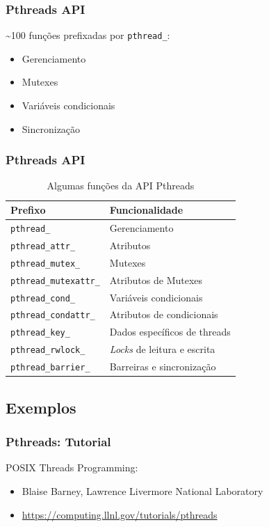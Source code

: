 \documentclass[10pt, compress, aspectratio=169, xcolor={table,usenames,dvipsnames}]{beamer}
\begin{document}
\begin{frame}
    \frametitle{Pthreads API}
    \alert{\textasciitilde{}100 funções} prefixadas por \texttt{pthread\_}:
    \begin{itemize}
        \item Gerenciamento
        \item Mutexes
        \item Variáveis condicionais
        \item Sincronização
    \end{itemize}
\end{frame}

\begin{frame}
    \frametitle{Pthreads API}
    \begin{table}[]
        \centering
        \begin{tabular}{@{}ll@{}}
            \toprule
            \textbf{Prefixo} & \textbf{Funcionalidade} \\ \midrule
            \texttt{pthread\_} &  Gerenciamento \\
            \texttt{pthread\_attr\_} & Atributos \\
            \texttt{pthread\_mutex\_} &  Mutexes \\
            \texttt{pthread\_mutexattr\_} & Atributos de Mutexes \\
            \texttt{pthread\_cond\_} & Variáveis condicionais \\
            \texttt{pthread\_condattr\_} & Atributos de condicionais \\
            \texttt{pthread\_key\_} & Dados específicos de threads \\
            \texttt{pthread\_rwlock\_} & \textit{Locks} de leitura e escrita \\
            \texttt{pthread\_barrier\_} &  Barreiras e sincronização \\ \bottomrule
        \end{tabular}
        \label{my-label}
        \caption{Algumas funções da API Pthreads}
    \end{table}
\end{frame}

\subsection{Exemplos}

\begin{frame}
    \frametitle{Pthreads: Tutorial}
    \alert{POSIX Threads Programming}:
    \begin{itemize}
        \item Blaise Barney, Lawrence Livermore National Laboratory
        \item \url{https://computing.llnl.gov/tutorials/pthreads}
    \end{itemize}
\end{frame}
\end{document}
